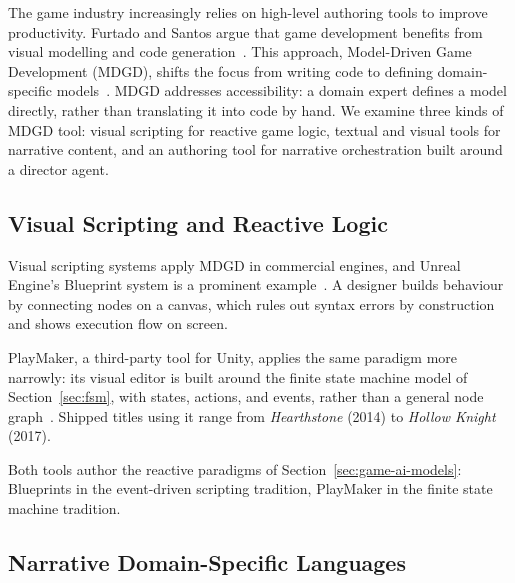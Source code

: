 The game industry increasingly relies on high-level authoring tools to improve productivity. Furtado and Santos argue that game development benefits from visual modelling and code generation~\cite{Furtado2006}. This approach, Model-Driven Game Development (MDGD), shifts the focus from writing code to defining domain-specific models~\cite{Zhu2019}. MDGD addresses accessibility: a domain expert defines a model directly, rather than translating it into code by hand. We examine three kinds of MDGD tool: visual scripting for reactive game logic, textual and visual tools for narrative content, and an authoring tool for narrative orchestration built around a director agent.
 
 
\subsection{Visual Scripting and Reactive Logic}
\label{sec:visual-scripting}
 
 
Visual scripting systems apply MDGD in commercial engines, and Unreal Engine's Blueprint system is a prominent example~\cite{Yannakakis2025}. A designer builds behaviour by connecting nodes on a canvas, which rules out syntax errors by construction and shows execution flow on screen.
 
PlayMaker, a third-party tool for Unity, applies the same paradigm more narrowly: its visual editor is built around the finite state machine model of Section~\ref{sec:fsm}, with states, actions, and events, rather than a general node graph~\cite{PlayMaker}. Shipped titles using it range from \textit{Hearthstone} (2014) to \textit{Hollow Knight} (2017).
 
Both tools author the reactive paradigms of Section~\ref{sec:game-ai-models}: Blueprints in the event-driven scripting tradition, PlayMaker in the finite state machine tradition.
 
 
\subsection{Narrative Domain-Specific Languages}
\label{sec:narrative-dsls}
 
